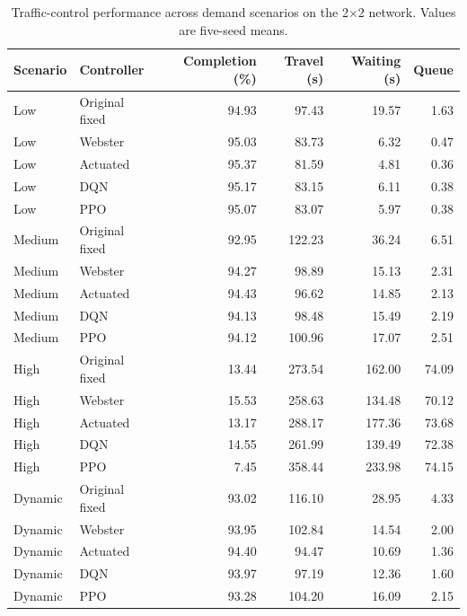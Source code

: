 \begin{table}[htbp]
\centering
\caption{Traffic-control performance across demand scenarios on the 2$\times$2 network. Values are five-seed means.}
\label{tab:demand_sensitivity_v2}
\small
\begin{tabular}{llrrrr}
\hline
Scenario & Controller & Completion (\%) & Travel (s) & Waiting (s) & Queue \\
\hline
Low & Original fixed & 94.93 & 97.43 & 19.57 & 1.63 \\
Low & Webster & 95.03 & 83.73 & 6.32 & 0.47 \\
Low & Actuated & 95.37 & 81.59 & 4.81 & 0.36 \\
Low & DQN & 95.17 & 83.15 & 6.11 & 0.38 \\
Low & PPO & 95.07 & 83.07 & 5.97 & 0.38 \\
\hline
Medium & Original fixed & 92.95 & 122.23 & 36.24 & 6.51 \\
Medium & Webster & 94.27 & 98.89 & 15.13 & 2.31 \\
Medium & Actuated & 94.43 & 96.62 & 14.85 & 2.13 \\
Medium & DQN & 94.13 & 98.48 & 15.49 & 2.19 \\
Medium & PPO & 94.12 & 100.96 & 17.07 & 2.51 \\
\hline
High & Original fixed & 13.44 & 273.54 & 162.00 & 74.09 \\
High & Webster & 15.53 & 258.63 & 134.48 & 70.12 \\
High & Actuated & 13.17 & 288.17 & 177.36 & 73.68 \\
High & DQN & 14.55 & 261.99 & 139.49 & 72.38 \\
High & PPO & 7.45 & 358.44 & 233.98 & 74.15 \\
\hline
Dynamic & Original fixed & 93.02 & 116.10 & 28.95 & 4.33 \\
Dynamic & Webster & 93.95 & 102.84 & 14.54 & 2.00 \\
Dynamic & Actuated & 94.40 & 94.47 & 10.69 & 1.36 \\
Dynamic & DQN & 93.97 & 97.19 & 12.36 & 1.60 \\
Dynamic & PPO & 93.28 & 104.20 & 16.09 & 2.15 \\
\hline
\end{tabular}
\end{table}
